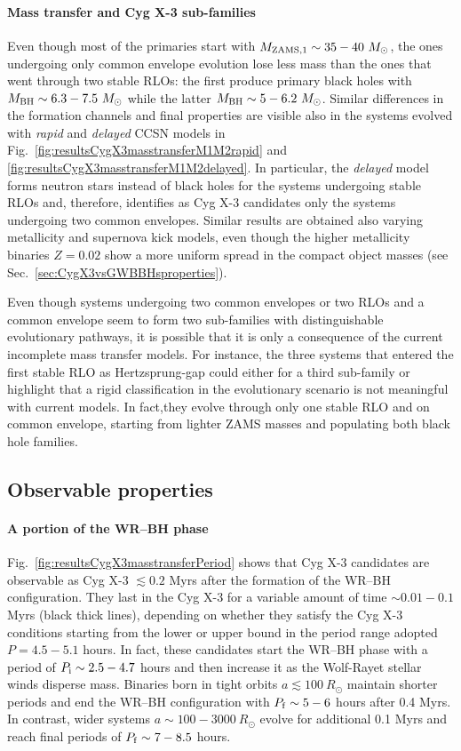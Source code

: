 \documentclass[a4paper,titlepage]{book}     	%
\newcommand{\sun}{\ensuremath{_\odot}}
\newcommand{\msun}{\ensuremath{M\sun}}
\newcommand{\rsun}{R_{\odot}}
\newcommand{\mbh}{\ensuremath{M_\textup{BH}}}
\begin{document}
\paragraph{Mass transfer and Cyg X-3 sub-families} Even though most of the primaries start with $M_{\rm ZAMS,1} \sim 35-40~\msun$, the ones undergoing only common envelope evolution lose less mass than the ones that went through two stable RLOs: the first produce primary black holes with $\mbh \sim 6.3-7.5~\msun$ while the latter $\mbh \sim 5-6.2~\msun$. Similar differences in the formation channels and final properties are visible also in the systems evolved with \emph{rapid} and \emph{delayed} CCSN models in Fig.\ \ref{fig:resultsCygX3masstransferM1M2rapid} and \ref{fig:resultsCygX3masstransferM1M2delayed}. In particular, the \emph{delayed} model forms neutron stars instead of black holes for the systems undergoing stable RLOs and, therefore, identifies as Cyg X-3 candidates only the systems undergoing two common envelopes. Similar results are obtained also varying metallicity and supernova kick models, even though the higher metallicity binaries $Z=0.02$ show a more uniform spread in the compact object masses (see Sec.\ \ref{sec:CygX3vsGWBBHsproperties}).

Even though systems undergoing two common envelopes or two RLOs and a common envelope seem to form two sub-families with distinguishable evolutionary pathways, it is possible that it is only a consequence of the current incomplete mass transfer models. For instance, the three systems that entered the first stable RLO as Hertzsprung-gap could either for a third sub-family or highlight that a rigid classification in the evolutionary scenario is not meaningful with current models. In fact,they evolve through only one stable RLO and on common envelope, starting from lighter ZAMS masses and populating both black hole families.




\subsection{Observable properties}\label{subsec:CygX3}
\paragraph{A portion of the WR--BH phase} Fig.\ \ref{fig:resultsCygX3masstransferPeriod} shows that Cyg X-3 candidates are observable as Cyg X-3 $\lesssim 0.2$ Myrs after the formation of the WR--BH configuration. They last in the Cyg X-3 for a variable amount of time $\sim 0.01-0.1$ Myrs (black thick lines), depending on whether they satisfy the Cyg X-3 conditions starting from the lower or upper bound in the period range adopted $P=4.5-5.1$ hours. In fact, these candidates start the WR--BH phase with a period of $P_{\rm i} \sim 2.5-4.7$ hours and then increase it as the Wolf-Rayet stellar winds disperse mass. Binaries born in tight orbits $a \lesssim 100~\rsun$ maintain shorter periods and end the WR--BH configuration with $P_{\rm f} \sim 5-6$ hours after 0.4 Myrs. In contrast, wider systems $a \sim 100 - 3000~\rsun$ evolve for additional 0.1 Myrs and reach final periods of $P_{\rm f} \sim 7-8.5$ hours.
\end{document}
